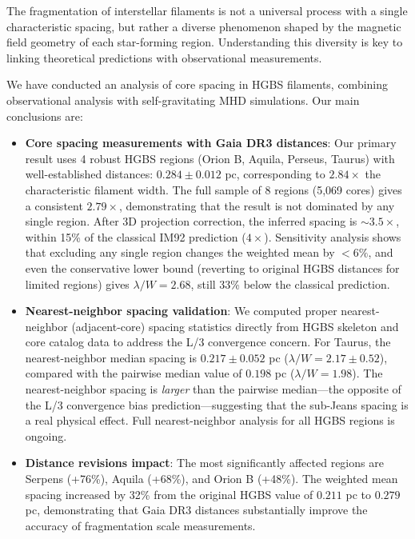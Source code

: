 \documentclass[twoside,twocolumn]{mnras}
\begin{document}
The fragmentation of interstellar filaments is not a universal process with a single characteristic spacing, but rather a diverse phenomenon shaped by the magnetic field geometry of each star-forming region. Understanding this diversity is key to linking theoretical predictions with observational measurements.

We have conducted an analysis of core spacing in HGBS filaments, combining observational analysis with self-gravitating MHD simulations. Our main conclusions are:

\begin{itemize}
    \item \textbf{Core spacing measurements with Gaia DR3 distances}: Our primary result uses 4 robust HGBS regions (Orion B, Aquila, Perseus, Taurus) with well-established distances: $0.284 \pm 0.012$ pc, corresponding to $2.84\times$ the characteristic filament width. The full sample of 8 regions (5,069 cores) gives a consistent $2.79\times$, demonstrating that the result is not dominated by any single region. After 3D projection correction, the inferred spacing is $\sim3.5\times$, within 15\% of the classical IM92 prediction ($4\times$). Sensitivity analysis shows that excluding any single region changes the weighted mean by $<6\%$, and even the conservative lower bound (reverting to original HGBS distances for limited regions) gives $\lambda/W = 2.68$, still 33\% below the classical prediction.

    \item \textbf{Nearest-neighbor spacing validation}: We computed proper nearest-neighbor (adjacent-core) spacing statistics directly from HGBS skeleton and core catalog data to address the L/3 convergence concern. For Taurus, the nearest-neighbor median spacing is $0.217 \pm 0.052$ pc ($\lambda/W = 2.17 \pm 0.52$), compared with the pairwise median value of $0.198$ pc ($\lambda/W = 1.98$). The nearest-neighbor spacing is \textit{larger} than the pairwise median—the opposite of the L/3 convergence bias prediction—suggesting that the sub-Jeans spacing is a real physical effect. Full nearest-neighbor analysis for all HGBS regions is ongoing.

    \item \textbf{Distance revisions impact}: The most significantly affected regions are Serpens (+76\%), Aquila (+68\%), and Orion B (+48\%). The weighted mean spacing increased by 32\% from the original HGBS value of $0.211$ pc to $0.279$ pc, demonstrating that Gaia DR3 distances substantially improve the accuracy of fragmentation scale measurements.


\end{itemize}
\end{document}
